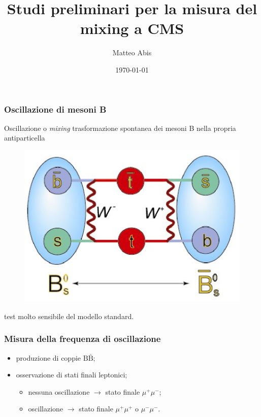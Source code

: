 \documentclass[italian]{beamer}
\title[Studi preliminari per la misura del mixing a CMS]{Studi preliminari per la misura del mixing a CMS}
\author{Matteo Abis}
\institute{Università di Padova}
\date{\today}
\newcommand{\meson}[1]{\ensuremath{\mathrm{#1}}}
\begin{document}
\begin{frame}
    \titlepage
\end{frame}

\begin{frame}
    \frametitle{Oscillazione di mesoni B}
    \begin{block}{Oscillazione o \emph{mixing}}
        {trasformazione spontanea dei mesoni B nella propria
        antiparticella}
    \end{block}
    \begin{figure}[h]
        \centering
        \includegraphics[width=.3\textwidth]{BsMixingBox.eps}
    \end{figure}
    test molto sensibile del modello standard.
\end{frame}

\begin{frame}
    \frametitle{Misura della frequenza di oscillazione}
    \begin{itemize}
        \item produzione di coppie $\meson{B}\meson{\bar{B}}$;
        \item osservazione di stati finali leptonici;
            \begin{itemize}
                \item nessuna oscillazione $\longrightarrow$ stato finale
                    $\mu^+\mu^-$;
                \item oscillazione $\longrightarrow$ stato finale
                    $\mu^+\mu^+$ o $\mu^-\mu^-$.
            \end{itemize}
    \end{itemize}
\end{frame}
\end{document}
